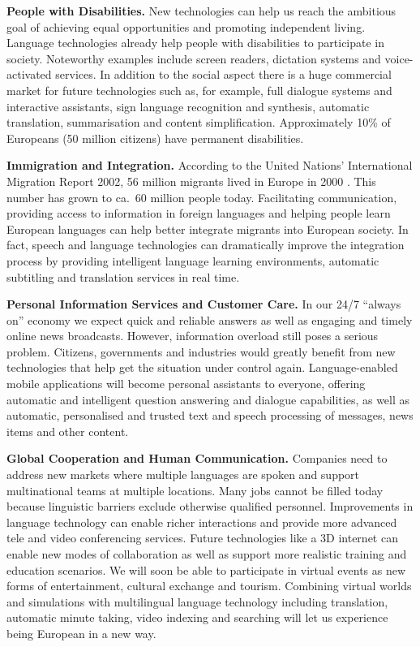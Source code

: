 \documentclass[10pt, plain]{../../metanetpaper}
\begin{document}
\begin{multicols}{2}
\textbf{People with Disabilities.} New technologies can help us reach the ambitious goal of achieving equal opportunities and promoting independent living. Language technologies already help people with disabilities to participate in society. Noteworthy examples include screen readers, dictation systems and voice-activated services. In addition to the social aspect there is a huge commercial market for future technologies such as, for example, full dialogue systems and interactive assistants, sign language recognition and synthesis, automatic translation, summarisation and content simplification. Approximately 10\% of Europeans (50 million citizens) have permanent disabilities.

\textbf{Immigration and Integration.} According to the United Nations' International Migration Report 2002, 56 million migrants lived in Europe in 2000 \cite{UN1}. This number has grown to ca.~60 million people today. Facilitating communication, providing access to information in foreign languages and helping people learn European languages can help better integrate migrants into European society. In fact, speech and language technologies can dramatically improve the integration process by providing intelligent language learning environments, automatic subtitling and translation services in real time.

\textbf{Personal Information Services and Customer Care.} In our 24/7 ``always on'' economy we expect quick and reliable answers as well as engaging and timely online news broadcasts. However, information overload still poses a serious problem. Citizens, governments and industries would greatly benefit from new technologies that help get the situation under control again. Language-enabled mobile applications will become personal assistants to everyone, offering automatic and intelligent question answering and dialogue capabilities, as well as automatic, personalised and trusted text and speech processing of messages, news items and other content.

\textbf{Global Cooperation and Human Communication.} Companies need to address new markets where multiple languages are spoken and support multinational teams at multiple locations. Many jobs cannot be filled today because linguistic barriers exclude otherwise qualified personnel. Improvements in language technology can enable richer interactions and provide more advanced tele and video conferencing services. Future technologies like a 3D internet can enable new modes of collaboration as well as support more realistic training and education scenarios. We will soon be able to participate in virtual events as new forms of entertainment, cultural exchange and tourism. Combining virtual worlds and simulations with multilingual language technology including translation, automatic minute taking, video indexing and searching will let us experience being European in a new way.


\end{multicols}
\end{document}

